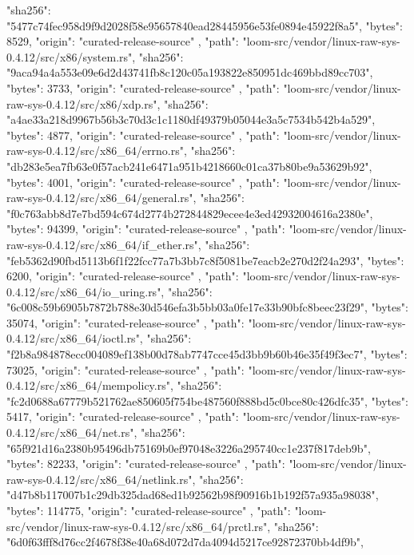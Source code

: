 {{      "sha256": "5477c74fec958d9f9d2028f58e95657840ead28445956e53fe0894e45922f8a5",
      "bytes": 8529,
      "origin": "curated-release-source"
    },
    {
      "path": "loom-src/vendor/linux-raw-sys-0.4.12/src/x86/system.rs",
      "sha256": "9aca94a4a553e09e6d2d43741fb8c120c05a193822e850951dc469bbd89cc703",
      "bytes": 3733,
      "origin": "curated-release-source"
    },
    {
      "path": "loom-src/vendor/linux-raw-sys-0.4.12/src/x86/xdp.rs",
      "sha256": "a4ae33a218d9967b56b3c70d3c1c1180df49379b05044e3a5c7534b542b4a529",
      "bytes": 4877,
      "origin": "curated-release-source"
    },
    {
      "path": "loom-src/vendor/linux-raw-sys-0.4.12/src/x86_64/errno.rs",
      "sha256": "db283e5ea7fb63e0f57acb241e6471a951b4218660c01ca37b80be9a53629b92",
      "bytes": 4001,
      "origin": "curated-release-source"
    },
    {
      "path": "loom-src/vendor/linux-raw-sys-0.4.12/src/x86_64/general.rs",
      "sha256": "f0c763abb8d7e7bd594c674d2774b272844829ecee4e3ed42932004616a2380e",
      "bytes": 94399,
      "origin": "curated-release-source"
    },
    {
      "path": "loom-src/vendor/linux-raw-sys-0.4.12/src/x86_64/if_ether.rs",
      "sha256": "feb5362d90fbd5113b6f1f22fcc77a7b3bb7c8f5081be7eacb2e270d2f24a293",
      "bytes": 6200,
      "origin": "curated-release-source"
    },
    {
      "path": "loom-src/vendor/linux-raw-sys-0.4.12/src/x86_64/io_uring.rs",
      "sha256": "6c008c59b6905b7872b788e30d546efa3b5bb03a0fe17e33b90bfc8beec23f29",
      "bytes": 35074,
      "origin": "curated-release-source"
    },
    {
      "path": "loom-src/vendor/linux-raw-sys-0.4.12/src/x86_64/ioctl.rs",
      "sha256": "f2b8a984878ecc004089ef138b00d78ab7747cce45d3bb9b60b46e35f49f3ec7",
      "bytes": 73025,
      "origin": "curated-release-source"
    },
    {
      "path": "loom-src/vendor/linux-raw-sys-0.4.12/src/x86_64/mempolicy.rs",
      "sha256": "fc2d0688a67779b521762ae850605f754be487560f888bd5c0bce80c426dfc35",
      "bytes": 5417,
      "origin": "curated-release-source"
    },
    {
      "path": "loom-src/vendor/linux-raw-sys-0.4.12/src/x86_64/net.rs",
      "sha256": "65f921d16a2380b95496db75169b0ef97048e3226a295740cc1e237f817deb9b",
      "bytes": 82233,
      "origin": "curated-release-source"
    },
    {
      "path": "loom-src/vendor/linux-raw-sys-0.4.12/src/x86_64/netlink.rs",
      "sha256": "d47b8b117007b1c29db325dad68ed1b92562b98f90916b1b192f57a935a98038",
      "bytes": 114775,
      "origin": "curated-release-source"
    },
    {
      "path": "loom-src/vendor/linux-raw-sys-0.4.12/src/x86_64/prctl.rs",
      "sha256": "6d0f63fff8d76cc2f4678f38e40a68d072d7da4094d5217ce92872370bb4df9b",
}}
